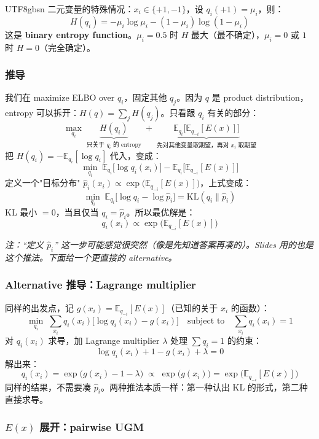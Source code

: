 \documentclass[11pt]{article}
\begin{document}
\begin{CJK}{UTF8}{gbsn}
二元变量的特殊情况：$x_i \in \{+1, -1\}$，设 $q_i(+1) = \mu_i$，则：
\[
  H(q_i) = -\mu_i \log \mu_i - (1-\mu_i)\log(1-\mu_i)
\]
这是 \textbf{binary entropy function}。$\mu_i = 0.5$ 时 $H$ 最大（最不确定），$\mu_i = 0$ 或 $1$ 时 $H = 0$（完全确定）。

\subsubsection{推导}

我们在 maximize ELBO over $q_i$，固定其他 $q_j$。因为 $q$ 是 product distribution，entropy 可以拆开：$H(q) = \sum_j H(q_j)$。只看跟 $q_i$ 有关的部分：
\[
  \max_{q_i}\; \underbrace{H(q_i)}_{\text{只关于 } q_i \text{ 的 entropy}}
  \;+\; \underbrace{\mathbb{E}_{q_i}\!\Big[\mathbb{E}_{q_{-i}}[E(x)]\Big]}_{\text{先对其他变量取期望，再对 } x_i \text{ 取期望}}
\]
把 $H(q_i) = -\mathbb{E}_{q_i}[\log q_i]$ 代入，变成：
\[
  \min_{q_i}\; \mathbb{E}_{q_i}\!\big[\log q_i(x_i)\big] - \mathbb{E}_{q_i}\!\big[\mathbb{E}_{q_{-i}}[E(x)]\big]
\]
定义一个"目标分布" $\hat{p}_i(x_i) \propto \exp\!\big(\mathbb{E}_{q_{-i}}[E(x)]\big)$，上式变成：
\[
  \min_{q_i}\; \mathbb{E}_{q_i}\!\big[\log q_i - \log \hat{p}_i\big] = \mathrm{KL}(q_i \| \hat{p}_i)
\]
KL 最小 $= 0$，当且仅当 $q_i = \hat{p}_i$。所以最优解是：
\[
  \boxed{q_i(x_i) \propto \exp\!\Big(\mathbb{E}_{q_{-i}}[E(x)]\Big)}
\]

\noindent\textit{注：``定义 $\hat{p}_i$'' 这一步可能感觉很突然（像是先知道答案再凑的）。Slides 用的也是这个推法。下面给一个更直接的 alternative。}

\subsubsection{Alternative 推导：Lagrange multiplier}

同样的出发点，记 $g(x_i) = \mathbb{E}_{q_{-i}}[E(x)]$（已知的关于 $x_i$ 的函数）：
\[
  \min_{q_i}\; \sum_{x_i} q_i(x_i)\big[\log q_i(x_i) - g(x_i)\big] \quad \text{subject to} \quad \sum_{x_i} q_i(x_i) = 1
\]
对 $q_i(x_i)$ 求导，加 Lagrange multiplier $\lambda$ 处理 $\sum q_i = 1$ 的约束：
\[
  \log q_i(x_i) + 1 - g(x_i) + \lambda = 0
\]
解出来：
\[
  q_i(x_i) = \exp\!\big(g(x_i) - 1 - \lambda\big) \;\propto\; \exp\!\big(g(x_i)\big) = \exp\!\Big(\mathbb{E}_{q_{-i}}[E(x)]\Big)
\]
同样的结果，不需要凑 $\hat{p}_i$。两种推法本质一样：第一种认出 KL 的形式，第二种直接求导。

\subsubsection{$E(x)$ 展开：pairwise UGM}


\end{CJK}
\end{document}
